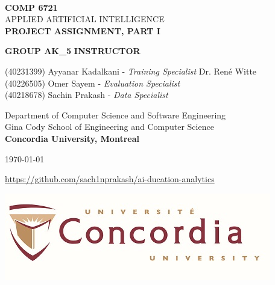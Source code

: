 \begin{titlepage}
    \begin{center}
        \textbf{\Large\\ COMP 6721}
        \vspace{1cm}
        \Huge\\  APPLIED ARTIFICIAL INTELLIGENCE
        \vspace{1cm}
        \textbf{\Large\\PROJECT ASSIGNMENT, PART I}\\
        \vspace{2cm}
    
        \Large \textbf{GROUP AK\_5} \hfill  \textbf{INSTRUCTOR}\\
        \begin{large}
            \begin{flushleft}
                \vspace{.1cm}
                (40231399) Ayyanar Kadalkani - \textit{Training Specialist} \hfill Dr. René Witte\\
                (40226505) Omer Sayem - \textit{Evaluation Specialist}\\
                (40218678) Sachin Prakash - \textit{Data Specialist}\\
            \end{flushleft}
        \end{large}
    
        \begin{Large}  
            \vspace{1 cm}
            Department of Computer Science and Software Engineering \\
            Gina Cody School of Engineering and Computer Science \\
            \textbf{Concordia University, Montreal}\\
            \vspace{1 cm}
    
            \today \\
        \end{Large}
    \end{center}
    \vspace*{3em}
    \begin{center}
        \url{https://github.com/sach1nprakash/ai-ducation-analytics}
    \end{center}
  
    \vfill
    \begin{center}
      \includegraphics[width = 50ex]{resources/concordia_med.jpg}
    \end{center}    
\end{titlepage}